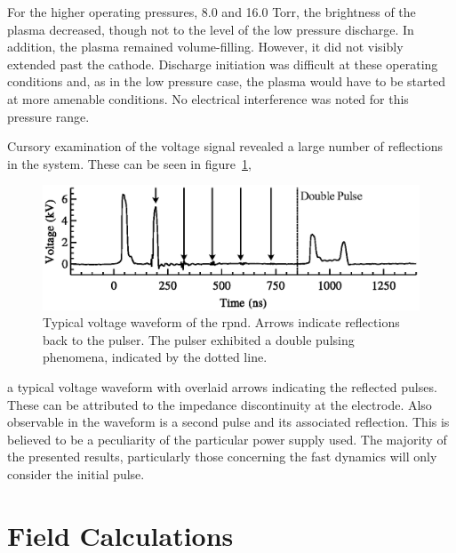 For the higher operating pressures, 8.0 and 16.0 Torr, the brightness of the
plasma decreased, though not to the level of the low pressure discharge. In
addition, the plasma remained volume-filling. However, it did not visibly
extended past the cathode. Discharge initiation was difficult at these operating
conditions and, as in the low pressure case, the plasma would have to be started
at more amenable conditions. No electrical interference was noted for this
pressure range.

Cursory examination of the voltage signal revealed a large number of reflections
in the system. These can be seen in figure~\ref{fig:waveform},
\begin{figure}
  \centering
  \includegraphics{./chapters/experiment/figures/waveform.eps}
  \caption{Typical voltage waveform of the \acs{rpnd}. Arrows indicate
  reflections back to the pulser. The pulser exhibited a double pulsing
  phenomena, indicated by the dotted line.}
  \label{fig:waveform}
\end{figure}
a typical voltage waveform with overlaid arrows indicating the reflected pulses.
These can be attributed to the impedance discontinuity at the electrode. Also
observable in the waveform is a second pulse and its associated reflection. This
is believed to be a peculiarity of the particular power supply used. The
majority of the presented results, particularly those concerning the fast
dynamics will only consider the initial pulse.

\section{Field Calculations}

